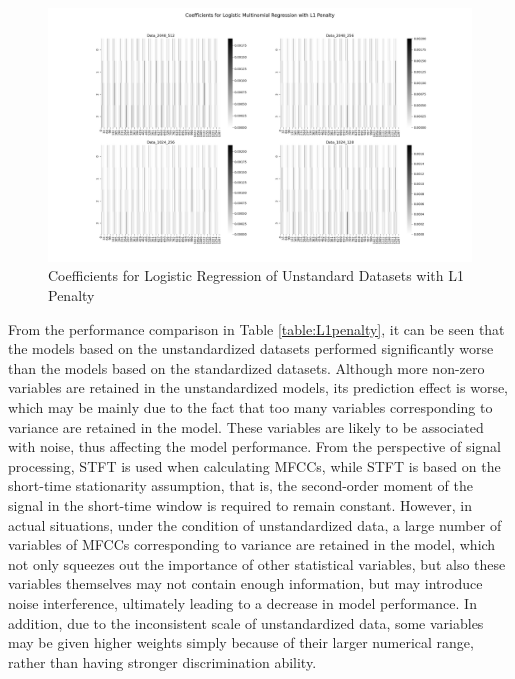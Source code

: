 \\
\begin{figure}[H]
	\centering
	\includegraphics[width=0.9\linewidth]{../Statistical_Sciences_template/figure/Coefficients for Logistic Multinomial Regression with L1 Penalty.png}
	\caption{Coefficients for Logistic Regression of Unstandard Datasets with L1 Penalty}
	\label{fig:MLRcoef}
\end{figure}
\noindent From the performance comparison in Table \ref{table:L1penalty}, it can be seen that the models based on the unstandardized datasets performed significantly worse than the models based on the standardized datasets. Although more non-zero variables are retained in the unstandardized models, its prediction effect is worse, which may be mainly due to the fact that too many variables corresponding to variance are retained in the model. These variables are likely to be associated with noise, thus affecting the model performance. From the perspective of signal processing, STFT is used when calculating MFCCs, while STFT is based on the short-time stationarity assumption, that is, the second-order moment of the signal in the short-time window is required to remain constant. However, in actual situations, under the condition of unstandardized data, a large number of variables of MFCCs corresponding to variance are retained in the model, which not only squeezes out the importance of other statistical variables, but also these variables themselves may not contain enough information, but may introduce noise interference, ultimately leading to a decrease in model performance. In addition, due to the inconsistent scale of unstandardized data, some variables may be given higher weights simply because of their larger numerical range, rather than having stronger discrimination ability.\\
\\
